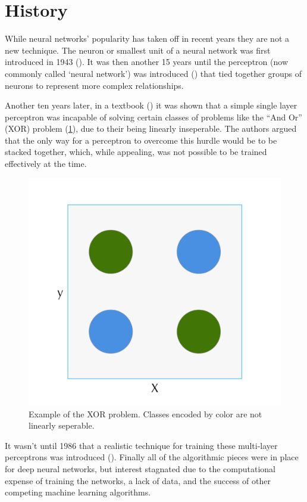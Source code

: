 \documentclass[]{book}
\theoremstyle{definition}
\theoremstyle{definition}
\theoremstyle{definition}
\theoremstyle{remark}
\begin{document}
\section{History}\label{history}

While neural networks' popularity has taken off in recent years they are
not a new technique. The neuron or smallest unit of a neural network was
first introduced in 1943 (\citet{mcculloch_neuron}). It was then another
15 years until the perceptron (now commonly called `neural network') was
introduced (\citet{rosenblatt_perceptron}) that tied together groups of
neurons to represent more complex relationships.

Another ten years later, in a textbook (\citet{minsky_perceptrons}) it
was shown that a simple single layer perceptron was incapable of solving
certain classes of problems like the ``And Or'' (XOR) problem
(\ref{fig:xorproble}), due to their being linearly inseperable. The
authors argued that the only way for a perceptron to overcome this
hurdle would be to be stacked together, which, while appealing, was not
possible to be trained effectively at the time.

\begin{figure}

{\centering \includegraphics[width=0.5\linewidth]{figures/xor_problem} 

}

\caption{Example of the XOR problem. Classes encoded by color are not linearly seperable.}\label{fig:xorproble}
\end{figure}

It wasn't until 1986 that a realistic technique for training these
multi-layer perceptrons was introduced (\citet{backprop_1986}). Finally
all of the algorithmic pieces were in place for deep neural networks,
but interest stagnated due to the computational expense of training the
networks, a lack of data, and the success of other competing machine
learning algorithms.
\end{document}
